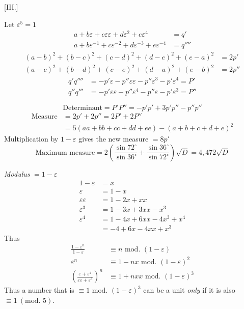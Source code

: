 %
\begin{center}[III.]\end{center}
Let $\varepsilon^5=1$
\[
\begin{aligned}
a+b\varepsilon+c\varepsilon\varepsilon+d\varepsilon^2+e\varepsilon^4&=q'\\
a+b\varepsilon^{-1}+c\varepsilon^{-2}+d\varepsilon^{-3}+e\varepsilon^{-4}&=q''''
\end{aligned}
\]
\[
\begin{aligned}
(a-b)^2+(b-c)^2+(c-d)^2+(d-e)^2+(e-a)^2&=2p'\\
(a-c)^2+(b-d)^2+(c-e)^2+(d-a)^2+(e-b)^2&=2p''
\end{aligned}
\]
\[
\begin{aligned}
q'q''''&=-p'\varepsilon-p''\varepsilon\varepsilon-p''\varepsilon^3-p'\varepsilon^4=P'\\
q''q'''&=-p'\varepsilon\varepsilon-p''\varepsilon^4-p''\varepsilon-p'\varepsilon^3=P''
\end{aligned}
\]

\[
\text{Determinant}=P'P''=-p'p'+3p'p''-p''p''
\]
\[
\begin{aligned}
\text{Measure}&=2p'+2p''=2P'+2P''\\
&=5(aa+bb+cc+dd+ee)-(a+b+c+d+e)^2
\end{aligned}
\]
Multiplication by $1-\varepsilon$ gives the new measure $=8p'$
\[
\text{Maximum measure}=2\left(\frac{\sin72^\circ}{\sin36^\circ}+\frac{\sin36^\circ}{\sin72^\circ}\right)\surd D=4{,}472\surd D
\]

\emph{Modulus} $=1-\varepsilon$
\[
\begin{aligned}
1-\varepsilon&=x\\
\varepsilon&=1-x\\
\varepsilon\varepsilon&=1-2x+xx\\
\varepsilon^3&=1-3x+3xx-x^3\\
\varepsilon^4&=1-4x+6xx-4x^3+x^4\\
&=-4+6x-4xx+x^3
\end{aligned}
\]
Thus
\[
\begin{aligned}
\frac{1-\varepsilon^n}{1-\varepsilon}&\equiv n\text{ mod. }(1-\varepsilon)\\
\varepsilon^n&\equiv1-nx\text{ mod. }(1-\varepsilon)^2\\
\left(\frac{\varepsilon+\varepsilon^4}{\varepsilon\varepsilon+\varepsilon^3}\right)^n&\equiv1+nxx\text{ mod. }(1-\varepsilon)^3
\end{aligned}
\]
Thus a number that is $\equiv1\text{ mod. }(1-\varepsilon)^3$ can be a unit \emph{only} if it is also $\equiv1\ (\text{mod. }5)$.

